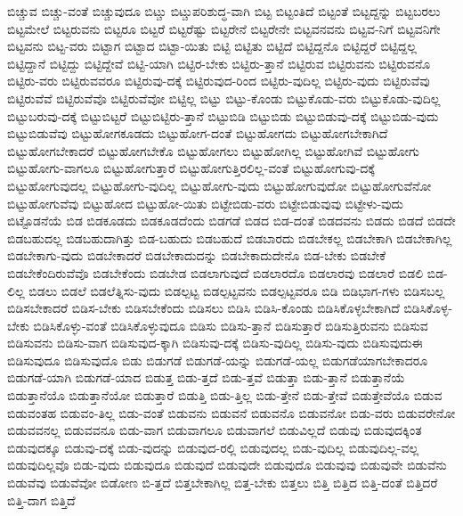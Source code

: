 {ಬಿಚ್ಚುವ
ಬಿಚ್ಚು-ವಂತೆ
ಬಿಚ್ಚುವುದೂ
ಬಿಟ್ಚು
ಬಿಟ್ಚುಪರಿಶುದ್ಧ-ವಾಗಿ
ಬಿಟ್ಟ
ಬಿಟ್ಟಂತಿದೆ
ಬಿಟ್ಟಂತೆ
ಬಿಟ್ಟದ್ದನ್ನು
ಬಿಟ್ಟಬರಲು
ಬಿಟ್ಟಮೇಲೆ
ಬಿಟ್ಟರುವನು
ಬಿಟ್ಟರೂ
ಬಿಟ್ಟರೆ
ಬಿಟ್ಟರೆಷ್ಟು
ಬಿಟ್ಟರೇನೆ
ಬಿಟ್ಟರೇನೇ
ಬಿಟ್ಟವನವನು
ಬಿಟ್ಟವ-ನಿಗೆ
ಬಿಟ್ಟವನಿಗೇ
ಬಿಟ್ಟವನು
ಬಿಟ್ಟ-ವರು
ಬಿಟ್ಟಾಗ
ಬಿಟ್ಟಾದ
ಬಿಟ್ಟಾ-ಯಿತು
ಬಿಟ್ಟಿ
ಬಿಟ್ಟಿತು
ಬಿಟ್ಟಿದೆ
ಬಿಟ್ಟಿದ್ದನೊ
ಬಿಟ್ಟಿದ್ದರೆ
ಬಿಟ್ಟಿದ್ದಲ್ಲ
ಬಿಟ್ಟಿದ್ದಾನೆ
ಬಿಟ್ಟಿದ್ದು
ಬಿಟ್ಟಿದ್ದೇವೆ
ಬಿಟ್ಟಿ-ಯಾಗಿ
ಬಿಟ್ಟಿರ-ಬೇಕು
ಬಿಟ್ಟಿರು-ತ್ತಾನೆ
ಬಿಟ್ಟಿರುವ
ಬಿಟ್ಟಿರುವನು
ಬಿಟ್ಟಿರುವನೊ
ಬಿಟ್ಟಿರು-ವರು
ಬಿಟ್ಟಿರುವವರೂ
ಬಿಟ್ಟಿರುವು-ದಕ್ಕೆ
ಬಿಟ್ಟಿರುವುದ-ರಿಂದ
ಬಿಟ್ಟಿರು-ವುದಿಲ್ಲ
ಬಿಟ್ಟಿರು-ವುದು
ಬಿಟ್ಟಿರುವೆವು
ಬಿಟ್ಟಿರುವೆವೆ
ಬಿಟ್ಟಿರುವೆವೊ
ಬಿಟ್ಟಿರುವೆವೋ
ಬಿಟ್ಟಿಲ್ಲ
ಬಿಟ್ಟು
ಬಿಟ್ಟು-ಕೊಂಡು
ಬಿಟ್ಟುಕೊಡು-ವರು
ಬಿಟ್ಟುಕೊಡು-ವುದಿಲ್ಲ
ಬಿಟ್ಟುಬರುವು-ದಕ್ಕೆ
ಬಿಟ್ಟುಬಿಟ್ಟರೆ
ಬಿಟ್ಟುಬಿಟ್ಟಿರು-ತ್ತಾನೆ
ಬಿಟ್ಟುಬಿಡಿ
ಬಿಟ್ಟುಬಿಡು
ಬಿಟ್ಟುಬಿಡುವು-ದಕ್ಕೆ
ಬಿಟ್ಟುಬಿಡು-ವುದು
ಬಿಟ್ಟುಬಿಡುವೆವು
ಬಿಟ್ಟುಹೋಗಕೂಡದು
ಬಿಟ್ಟುಹೋಗ-ದಂತೆ
ಬಿಟ್ಟುಹೋಗದು
ಬಿಟ್ಟುಹೋಗಬೇಕಾಗಿದೆ
ಬಿಟ್ಟುಹೋಗಬೇಕಾದರೆ
ಬಿಟ್ಟುಹೋಗಬೇಕೊ
ಬಿಟ್ಟುಹೋಗಲು
ಬಿಟ್ಟುಹೋಗಿಲ್ಲ
ಬಿಟ್ಟುಹೋಗಿವೆ
ಬಿಟ್ಟುಹೋಗು
ಬಿಟ್ಟುಹೋಗು-ವಾಗಲೂ
ಬಿಟ್ಟುಹೋಗುತ್ತಾರೆ
ಬಿಟ್ಟುಹೋಗುತ್ತಿರಲಿಲ್ಲ-ವಂತೆ
ಬಿಟ್ಟುಹೋಗುವು-ದಕ್ಕೆ
ಬಿಟ್ಟುಹೋಗುವುದಲ್ಲ
ಬಿಟ್ಟುಹೋಗು-ವುದಿಲ್ಲ
ಬಿಟ್ಟುಹೋಗು-ವುದು
ಬಿಟ್ಟುಹೋಗುವುದೋ
ಬಿಟ್ಟುಹೋಗುವೆನೋ
ಬಿಟ್ಟುಹೋಗುವೆವು
ಬಿಟ್ಟುಹೋದ
ಬಿಟ್ಟುಹೋ-ಯಿತು
ಬಿಟ್ಟೇಬಿಡು-ವರು
ಬಿಟ್ಟೇಬಿಡುವುವು
ಬಿಟ್ಟೇಳು-ವುದು
ಬಿಟ್ಟೊಡನೆಯೆ
ಬಿಡ
ಬಿಡಕೂಡದು
ಬಿಡಕೂಡದೆಂದು
ಬಿಡಗಡೆ
ಬಿಡದ
ಬಿಡ-ದಂತೆ
ಬಿಡದವನು
ಬಿಡದು
ಬಿಡದೆ
ಬಿಡದೇ
ಬಿಡಬಹುದಲ್ಲ
ಬಿಡಬಹುದಾಗಿತ್ತು
ಬಿಡ-ಬಹುದು
ಬಿಡಬಹುದೆ
ಬಿಡಬಾರದು
ಬಿಡಬೇಕಲ್ಲ
ಬಿಡಬೇಕಾಗಿ
ಬಿಡಬೇಕಾಗಿಲ್ಲ
ಬಿಡಬೇಕಾಗು-ವುದು
ಬಿಡಬೇಕಾದರೆ
ಬಿಡಬೇಕಾದುದನ್ನು
ಬಿಡಬೇಕಾದುದೇನೊ
ಬಿಡ-ಬೇಕು
ಬಿಡಬೇಕೆ
ಬಿಡಬೇಕೆಂದಿರುವೆವೊ
ಬಿಡಬೇಕೆಂದು
ಬಿಡಬೇಡ
ಬಿಡಲಾಗುವುದೆ
ಬಿಡಲಾರದೊ
ಬಿಡಲಾರವು
ಬಿಡಲಾರೆ
ಬಿಡಲಿ
ಬಿಡ-ಲಿಲ್ಲ
ಬಿಡಲು
ಬಿಡಲೆ
ಬಿಡಲೆತ್ನಿಸು-ವುದು
ಬಿಡಲ್ಪಟ್ಟ
ಬಿಡಲ್ಪಟ್ಟವನು
ಬಿಡಲ್ಪಟ್ಟವರೂ
ಬಿಡಿ
ಬಿಡಿಭಾಗ-ಗಳು
ಬಿಡಿಸಬಲ್ಲ
ಬಿಡಿಸಬೇಕಾದರೆ
ಬಿಡಿಸ-ಬೇಕು
ಬಿಡಿಸಬೇಕೆಂದು
ಬಿಡಿಸಲು
ಬಿಡಿಸಿ
ಬಿಡಿಸಿ-ಕೊಂಡು
ಬಿಡಿಸಿಕೊಳ್ಳಬೇಕಾಗಿದೆ
ಬಿಡಿಸಿಕೊಳ್ಳ-ಬೇಕು
ಬಿಡಿಸಿಕೊಳ್ಳು-ವಂತೆ
ಬಿಡಿಸಿಕೊಳ್ಳುವುದೂ
ಬಿಡಿಸು
ಬಿಡಿಸು-ತ್ತಾನೆ
ಬಿಡಿಸುತ್ತಾರೆ
ಬಿಡಿಸುತ್ತಿರುವನು
ಬಿಡಿಸುವ
ಬಿಡಿಸುವನು
ಬಿಡಿಸು-ವಾಗ
ಬಿಡಿಸುವುದ-ಕ್ಕಾಗಿ
ಬಿಡಿಸುವು-ದಕ್ಕೆ
ಬಿಡಿಸು-ವುದಿಲ್ಲ
ಬಿಡಿಸು-ವುದು
ಬಿಡಿಸುವುದುಈ
ಬಿಡಿಸುವುದೂ
ಬಿಡಿಸುವುದೊ
ಬಿಡು
ಬಿಡುಗಡೆ
ಬಿಡುಗಡೆ-ಯನ್ನು
ಬಿಡುಗಡೆ-ಯಲ್ಲ
ಬಿಡುಗಡೆಯಾಗಬೇಕಾದರೂ
ಬಿಡುಗಡೆ-ಯಾಗಿ
ಬಿಡುಗಡೆ-ಯಾದ
ಬಿಡುತ್ತ
ಬಿಡು-ತ್ತದೆ
ಬಿಡು-ತ್ತವೆ
ಬಿಡುತ್ತಾ
ಬಿಡು-ತ್ತಾನೆ
ಬಿಡುತ್ತಾನೆಯೆ
ಬಿಡುತ್ತಾನೆಯೊ
ಬಿಡುತ್ತಾನೆಯೋ
ಬಿಡುತ್ತಾರೆ
ಬಿಡುತ್ತಿ
ಬಿಡು-ತ್ತಿಲ್ಲ
ಬಿಡು-ತ್ತೇನೆ
ಬಿಡು-ತ್ತೇವೆ
ಬಿಡುತ್ತೇವೆಯೊ
ಬಿಡುವ
ಬಿಡುವಂತಹ
ಬಿಡುವಂ-ತಿಲ್ಲ
ಬಿಡು-ವಂತೆ
ಬಿಡುವನು
ಬಿಡುವನೆ
ಬಿಡುವನೊ
ಬಿಡುವನೋ
ಬಿಡು-ವರು
ಬಿಡುವರೇನೋ
ಬಿಡುವವನಲ್ಲ
ಬಿಡುವವನೂ
ಬಿಡು-ವಾಗ
ಬಿಡುವಾಗಲೂ
ಬಿಡುವಾಗಲೆ
ಬಿಡುವಿಲ್ಲದೆ
ಬಿಡುವು
ಬಿಡುವುದಕ್ಕಿಂತ
ಬಿಡುವುದಕ್ಕೂ
ಬಿಡುವು-ದಕ್ಕೆ
ಬಿಡು-ವುದನ್ನು
ಬಿಡುವುದ-ರಲ್ಲಿ
ಬಿಡುವುದಲ್ಲ
ಬಿಡು-ವುದಿಲ್ಲ
ಬಿಡುವುದಿಲ್ಲ-ವಲ್ಲ
ಬಿಡುವುದಿಲ್ಲವೊ
ಬಿಡು-ವುದು
ಬಿಡುವುದೂ
ಬಿಡುವುದೆ
ಬಿಡುವುದೇ
ಬಿಡುವುದೊ
ಬಿಡುವುವು
ಬಿಡುವುವೇ
ಬಿಡುವೆನು
ಬಿಡುವೆವು
ಬಿಡುವೆವೋ
ಬಿಡೋಣ
ಬಿ-ತ್ತದೆ
ಬಿತ್ತಬೇಕಾಗಿಲ್ಲ
ಬಿತ್ತ-ಬೇಕು
ಬಿತ್ತಲು
ಬಿತ್ತಿ
ಬಿತ್ತಿದ
ಬಿತ್ತಿ-ದಂತೆ
ಬಿತ್ತಿದರೆ
ಬಿತ್ತಿ-ದಾಗ
ಬಿತ್ತಿದೆ
}

